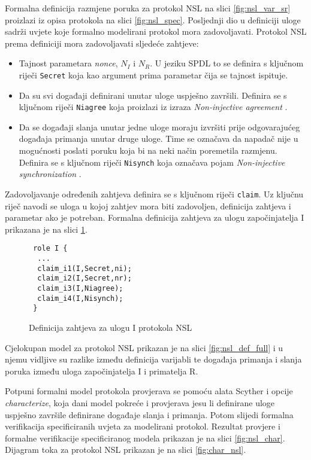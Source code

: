Formalna definicija razmjene poruka za protokol NSL na slici
\ref{fig:nsl_var_sr} proizlazi iz opisa protokola na slici
\ref{fig:nsl_spec}.
Posljednji dio u definiciji uloge sadrži uvjete koje formalno modelirani
protokol mora zadovoljavati. Protokol NSL prema definiciji mora zadovoljavati
sljedeće zahtjeve:
\begin{itemize}
    \item Tajnost parametara \emph{nonce}, $N_I$ i $N_R$. U jeziku SPDL to se
	definira s ključnom riječi \texttt{Secret} koja kao argument prima
	parametar čija se tajnost ispituje.
    \item Da su svi događaji definirani unutar uloge uspješno završili.
	Definira se s ključnom riječi
	\texttt{Niagree} koja proizlazi iz izraza \emph{Non-injective agreement}
	\cite{scyther_book}.
    \item Da se događaji slanja unutar jedne uloge moraju izvršiti prije
	odgovarajućeg događaja primanja unutar druge uloge. Time se označava da
	napadač nije u mogućnosti poslati poruku koja bi na neki način
	poremetila razmjenu. Definira se s ključnom riječi \texttt{Nisynch} koja
	označava pojam \emph{Non-injective synchronization} \cite{scyther_book}.
\end{itemize}

Zadovoljavanje određenih zahtjeva definira se s ključnom riječi \texttt{claim}.
Uz ključnu riječ navodi se uloga u kojoj zahtjev mora biti zadovoljen,
definicija zahtjeva i parametar ako je potreban. Formalna definicija zahtjeva za
ulogu započinjatelja I prikazana je na slici \ref{fig:nsl_claims}.

\begin{figure}[htb]
    \centering
\begin{small}
\begin{BVerbatim}
 role I {
  ...
  claim_i1(I,Secret,ni);
  claim_i2(I,Secret,nr);
  claim_i3(I,Niagree);
  claim_i4(I,Nisynch);
 }
\end{BVerbatim}
\end{small}
\vspace{-5pt}
\caption{Definicija zahtjeva za ulogu I protokola NSL}
\label{fig:nsl_claims}
\end{figure}

Cjelokupan model za protokol NSL prikazan je na slici \ref{fig:nsl_def_full} i u
njemu vidljive su razlike između definicija varijabli te događaja primanja
i slanja poruka između uloga započinjatelja I i primatelja R.

Potpuni formalni model protokola provjerava se pomoću alata Scyther i opcije
\emph{characterize}, koja dani model pokreće i provjerava jesu li definirane
uloge uspješno završile definirane događaje slanja i primanja. Potom slijedi
formalna verifikacija specificiranih uvjeta za modelirani protokol. Rezultat
provjere i formalne verifikacije specificiranog modela prikazan je na slici
\ref{fig:nsl_char}. Dijagram toka za protokol NSL prikazan je na slici
\ref{fig:char_nsl}.

